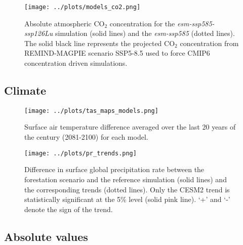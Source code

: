 \documentclass[]{article}
\begin{document}
\begin{figure}[H]
    \centering
    \texttt{[image: ../plots/models\_co2.png]}
    \caption{Absolute atmospheric CO$_2$ concentration for the \textit{esm-ssp585-ssp126Lu} simulation (solid lines) and the \textit{esm-ssp585} (dotted lines). The solid black line represents the projected CO$_2$ concentration from REMIND-MAGPIE scenario SSP5-8.5 used to force CMIP6 concentration driven simulations.}
    \label{fig:models_co2_absolute}
\end{figure}

\subsection{Climate}

\begin{figure}[H]
    \centering
    \texttt{[image: ../plots/tas\_maps\_models.png]}
    \caption{Surface air temperature difference averaged over the last 20 years of the century (2081-2100) for each model.}
    \label{fig:models_tas_maps}
\end{figure}

\begin{figure}[H]
    \centering
    \texttt{[image: ../plots/pr\_trends.png]}
    \caption{Difference in surface global precipitation rate between the forestation scenario and the reference simulation (solid lines) and the corresponding trends (dotted lines). Only the CESM2 trend is statistically significant at the 5\% level (solid pink line). `+' and `-' denote the sign of the trend.}
    \label{fig:models_pr_trends}
\end{figure}

\subsection{Absolute values}
\end{document}
